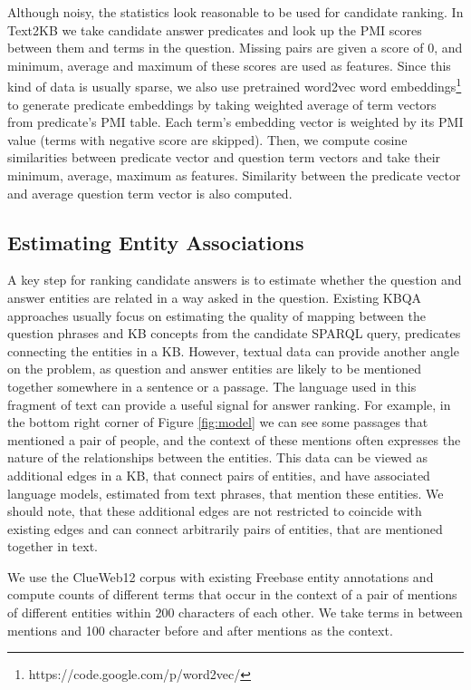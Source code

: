 Although noisy, the statistics look reasonable to be used for candidate ranking.
In Text2KB we take candidate answer predicates and look up the PMI scores between them and terms in the question.
Missing pairs are given a score of 0, and minimum, average and maximum of these scores are used as features.
Since this kind of data is usually sparse, we also use pretrained word2vec word embeddings\footnote{https://code.google.com/p/word2vec/} to generate predicate embeddings by taking weighted average of term vectors from predicate's PMI table.
Each term's embedding vector is weighted by its PMI value (terms with negative score are skipped).
Then, we compute cosine similarities between predicate vector and question term vectors and take their minimum, average, maximum as features.
Similarity between the predicate vector and average question term vector is also computed.

\subsection{Estimating Entity Associations}
\label{section:method:clueweb}

A key step for ranking candidate answers is to estimate whether the question and answer entities are related in a way asked in the question.
Existing KBQA approaches usually focus on estimating the quality of mapping between the question phrases and KB concepts from the candidate SPARQL query, \ie predicates connecting the entities in a KB.
However, textual data can provide another angle on the problem, as question and answer entities are likely to be mentioned together somewhere in a sentence or a passage.
The language used in this fragment of text can provide a useful signal for answer ranking.
For example, in the bottom right corner of Figure \ref{fig:model} we can see some passages that mentioned a pair of people, and the context of these mentions often expresses the nature of the relationships between the entities.
This data can be viewed as additional edges in a KB, that connect pairs of entities, and have associated language models, estimated from text phrases, that mention these entities.
We should note, that these additional edges are not restricted to coincide with existing edges and can connect arbitrarily pairs of entities, that are mentioned together in text.

We use the ClueWeb12 corpus with existing Freebase entity annotations and compute counts of different terms that occur in the context of a pair of mentions of different entities within 200 characters of each other.
We take terms in between mentions and 100 character before and after mentions as the context.


